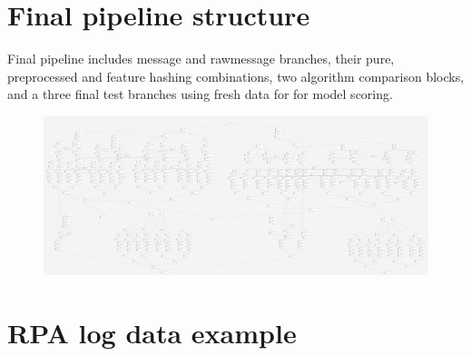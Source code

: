 
\clearpage


\thesisappendix

\section{Final pipeline structure}\label{sec:app-final-pipeline-structure}
{
    \scriptsize
    Final pipeline includes message and rawmessage branches, their pure, preprocessed and feature hashing combinations,
    two algorithm comparison blocks, and a three final test branches using fresh data for for model scoring.
}
\begin{figure}[htb]
    \centering
    \includegraphics[width=202mm,height=\textwidth,angle=90]{./appendices/pipeline-draft}
\end{figure}

\clearpage


\section{RPA log data example}\label{sec:app-log-data-input}

